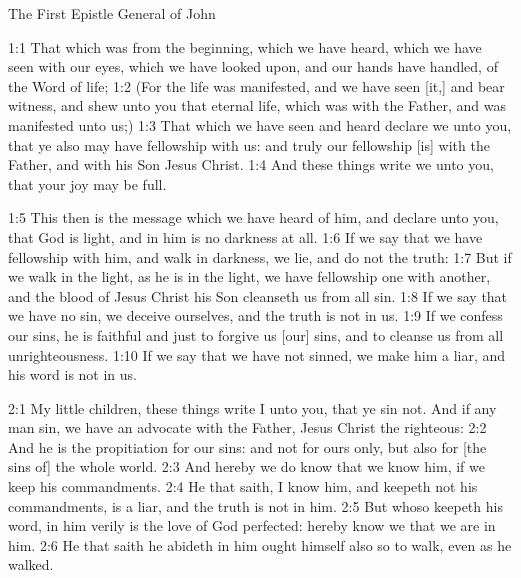 The First Epistle General of John

   {1:1} That which was from the beginning, which we have heard, which
we have seen with our eyes, which we have looked upon, and our hands
have handled, of the Word of life; {1:2} (For the life was manifested,
and we have seen [it,] and bear witness, and shew unto you that eternal
life, which was with the Father, and was manifested unto us;) {1:3}
That which we have seen and heard declare we unto you, that ye also may
have fellowship with us: and truly our fellowship [is] with the Father,
and with his Son Jesus Christ. {1:4} And these things write we unto
you, that your joy may be full.

   {1:5} This then is the message which we have heard of him, and
declare unto you, that God is light, and in him is no darkness at all.
{1:6} If we say that we have fellowship with him, and walk in darkness,
we lie, and do not the truth: {1:7} But if we walk in the light, as he
is in the light, we have fellowship one with another, and the blood of
Jesus Christ his Son cleanseth us from all sin. {1:8} If we say that we
have no sin, we deceive ourselves, and the truth is not in us. {1:9} If
we confess our sins, he is faithful and just to forgive us [our] sins,
and to cleanse us from all unrighteousness. {1:10} If we say that we
have not sinned, we make him a liar, and his word is not in us.

   {2:1} My little children, these things write I unto you, that ye sin
not. And if any man sin, we have an advocate with the Father, Jesus
Christ the righteous: {2:2} And he is the propitiation for our sins:
and not for ours only, but also for [the sins of] the whole world.
{2:3} And hereby we do know that we know him, if we keep his
commandments. {2:4} He that saith, I know him, and keepeth not his
commandments, is a liar, and the truth is not in him. {2:5} But whoso
keepeth his word, in him verily is the love of God perfected: hereby
know we that we are in him. {2:6} He that saith he abideth in him ought
himself also so to walk, even as he walked.

